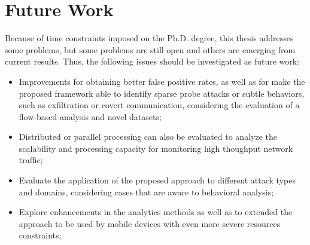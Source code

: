 \section{Future Work}
\label{sc:conc_futurework}

Because of time constraints imposed on the Ph.D. degree, this thesis addresses some problems, but some problems are still open and others are emerging from current results. Thus, the following issues should be investigated as future work:

\begin{itemize}
	\item Improvements for obtaining better false positive rates, as well as for make the proposed framework able to identify sparse probe attacks or subtle behaviors, such as exfiltration or covert communication, considering the evaluation of a flow-based analysis and novel datasets;
	\item Distributed or parallel processing can also be evaluated to analyze the scalability and processing capacity for monitoring high thoughput network traffic;
	\item Evaluate the application of the proposed approach to different attack types and domains, considering cases that are aware to behavioral analysis;
	\item Explore enhancements in the analytics methods as well as to extended the approach to be used by mobile devices with even more severe resources constraints;
\end{itemize}